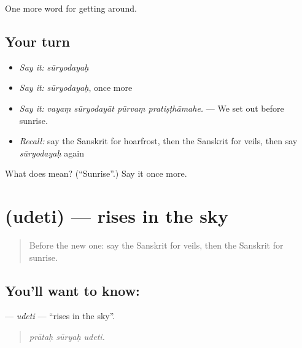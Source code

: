 \begin{grammarlens}[title={What you've built}]
One more word for getting around.
\end{grammarlens}

\subsection*{Your turn}
\begin{itemize}
\raggedright
  \item \emph{Say it:} \emph{sūryodayaḥ}
  \item \emph{Say it:} \emph{sūryodayaḥ}, once more
  \item \emph{Say it:} \emph{vayaṃ sūryodayāt pūrvaṃ pratiṣṭhāmahe.} — We set out before sunrise.
  \item \emph{Recall:} say the Sanskrit for hoarfrost, then the Sanskrit for veils, then say \emph{sūryodayaḥ} again
\end{itemize}

\begin{tcolorbox}[breakable,colback=teal!4,colframe=teal!35!black,title={Before you move on}]
What does  mean? (\textquotedblleft{}Sunrise\textquotedblright{}.) Say it once more.
\end{tcolorbox}
\section[\texorpdfstring{\sk{उदेति} (udeti)}{उदेति (udeti)}]{ (udeti) — rises in the sky}

\label{lesson:SA-C442-udeti}



\begin{quote}
Before the new one: say the Sanskrit for veils, then the Sanskrit for sunrise.
\end{quote}

\subsection*{You'll want to know: }
\textbf{} — \emph{udeti} — \textquotedblleft{}rises in the sky\textquotedblright{}.

\begin{quote}
  
\end{quote}

\begin{quote}
\emph{prātaḥ sūryaḥ udeti.}
\end{quote}

